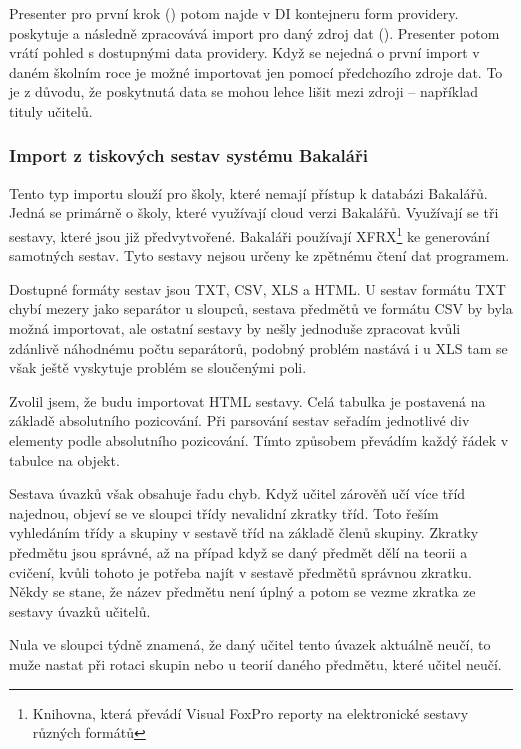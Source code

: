 Presenter pro první krok () potom najde v DI kontejneru form providery.
 poskytuje a následně zpracovává import pro daný zdroj dat ().
Presenter potom vrátí pohled s dostupnými data providery.
Když se nejedná o první import v daném školním roce je možné importovat jen pomocí předchozího zdroje dat.
To je z důvodu, že poskytnutá data se mohou lehce lišit mezi zdroji -- například tituly učitelů. 





\subsubsection{Import z tiskových sestav systému Bakaláři}\label{postup:sestavy}
Tento typ importu slouží pro školy, které nemají přístup k databázi Bakalářů. 
Jedná se primárně o školy, které využívají cloud verzi Bakalářů.
Využívají se tři sestavy, které jsou již předvytvořené.
Bakaláři používají XFRX\footnote{Knihovna, která převádí Visual FoxPro reporty na elektronické sestavy různých formátů} ke generování samotných sestav.
Tyto sestavy nejsou určeny ke zpětnému čtení dat programem.

Dostupné formáty sestav jsou TXT, CSV, XLS a HTML.
U sestav formátu TXT chybí mezery jako separátor u sloupců, sestava předmětů ve formátu CSV by byla možná importovat, ale ostatní sestavy by nešly jednoduše zpracovat kvůli zdánlivě náhodnému počtu separátorů, podobný problém nastává i u XLS tam se však ještě vyskytuje problém se sloučenými poli.

Zvolil jsem, že budu importovat HTML sestavy.
Celá tabulka je postavená na základě absolutního pozicování.
Při parsování sestav seřadím jednotlivé div elementy podle absolutního pozicování.
Tímto způsobem převádím každý řádek v tabulce na objekt.

Sestava úvazků však obsahuje řadu chyb.
Když učitel zárověň učí více tříd najednou, objeví se ve sloupci třídy nevalidní zkratky tříd. 
Toto řeším vyhledáním třídy a skupiny v sestavě tříd na základě členů skupiny. 
Zkratky předmětu jsou správné, až na případ když se daný předmět dělí na teorii a cvičení,
kvůli tohoto je potřeba najít v sestavě předmětů správnou zkratku.
Někdy se stane, že název předmětu není úplný a potom se vezme zkratka ze sestavy úvazků učitelů.


Nula ve sloupci týdně znamená, že daný učitel tento úvazek aktuálně neučí, to muže nastat při rotaci skupin nebo u teorií daného předmětu, které učitel neučí. 

